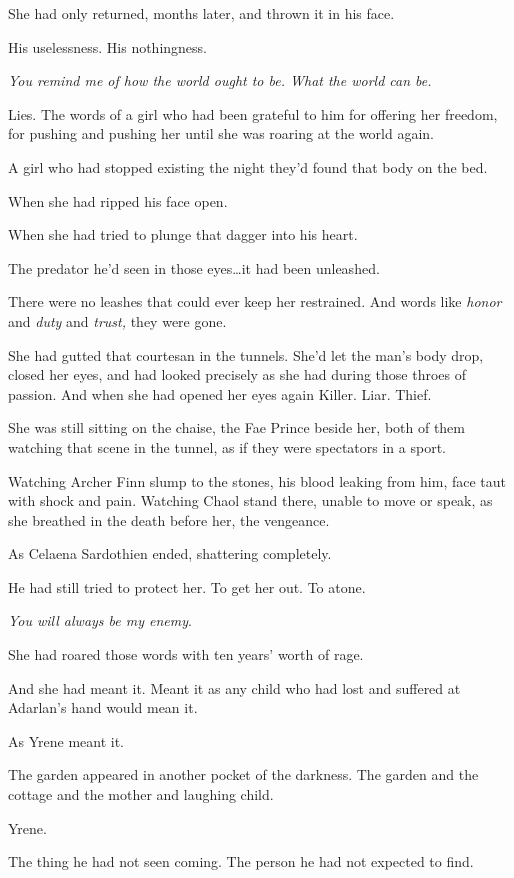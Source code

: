 She had only returned, months later, and thrown it in his face.

His uselessness.
His nothingness.

\emph{You remind me of how the world ought to be.
What the world can be.}

Lies.
The words of a girl who had been grateful to him for offering her freedom, for pushing and pushing her until she was roaring at the world again.

A girl who had stopped existing the night they'd found that body on the bed.

When she had ripped his face open.

When she had tried to plunge that dagger into his heart.

The predator he'd seen in those eyes\ldots it had been unleashed.

There were no leashes that could ever keep her restrained.
And words like \emph{honor} and \emph{duty} and \emph{trust,} they were gone.

She had gutted that courtesan in the tunnels.
She'd let the man's body drop, closed her eyes, and had looked precisely as she had during those throes of passion.
And when she had opened her eyes again 
Killer.
Liar.
Thief.

She was still sitting on the chaise, the Fae Prince beside her, both of them watching that scene in the tunnel, as if they were spectators in a sport.

Watching Archer Finn slump to the stones, his blood leaking from him, face taut with shock and pain.
Watching Chaol stand there, unable to move or speak, as she breathed in the death before her, the vengeance.

As Celaena Sardothien ended, shattering completely.

He had still tried to protect her.
To get her out.
To atone.

\emph{You will always be my enemy}.

She had roared those words with ten years' worth of rage.

And she had meant it.
Meant it as any child who had lost and suffered at Adarlan's hand would mean it.

As Yrene meant it.

The garden appeared in another pocket of the darkness.
The garden and the cottage and the mother and laughing child.

Yrene.

The thing he had not seen coming.
The person he had not expected to find.


